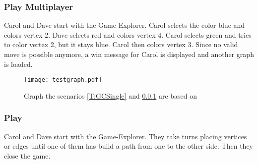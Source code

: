 \subsubsection{Play \graphcoloring Multiplayer} \label{T:GCMulti}

Carol and Dave start \graphcoloring with the Game-Explorer. Carol selects the color blue and colors vertex 2. Dave selects red and colors vertex 4. Carol selects green and tries to color vertex 2, but it stays blue. Carol then colors vertex 3. Since no valid move is possible anymore, a win message for Carol is displayed and another graph is loaded.

\begin{figure}[h!]
	\centering
	\texttt{[image: testgraph.pdf]}
	\caption{Graph the scenarios \ref{T:GCSingle} and \ref{T:GCMulti} are based on}
	\label{img:ACTDEV}
\end{figure}

\subsubsection{Play \twixt}

Carol and Dave start \twixt with the Game-Explorer. They take turns placing vertices or edges until one of them has build a path from one to the other side. Then they close the game.

